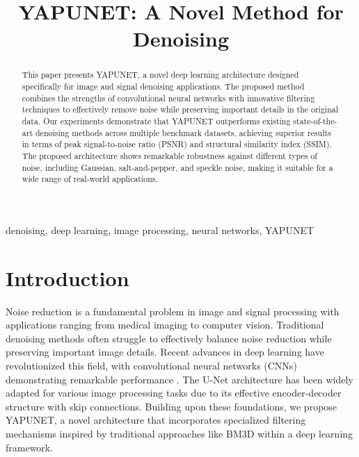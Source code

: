 \documentclass[conference]{IEEEtran}
\begin{document}
\title{YAPUNET: A Novel Method for Denoising\\
}
\author{
\and
{}
\and
{}
}
\maketitle
\begin{abstract}
This paper presents YAPUNET, a novel deep learning architecture designed specifically for image and signal denoising applications. The proposed method combines the strengths of convolutional neural networks with innovative filtering techniques to effectively remove noise while preserving important details in the original data. Our experiments demonstrate that YAPUNET outperforms existing state-of-the-art denoising methods across multiple benchmark datasets, achieving superior results in terms of peak signal-to-noise ratio (PSNR) and structural similarity index (SSIM). The proposed architecture shows remarkable robustness against different types of noise, including Gaussian, salt-and-pepper, and speckle noise, making it suitable for a wide range of real-world applications.
\end{abstract}
\begin{IEEEkeywords}
denoising, deep learning, image processing, neural networks, YAPUNET
\end{IEEEkeywords}
\section{Introduction}
\label{sec:introduction}
Noise reduction is a fundamental problem in image and signal processing with applications ranging from medical imaging to computer vision. Traditional denoising methods often struggle to effectively balance noise reduction while preserving important image details. Recent advances in deep learning have revolutionized this field, with convolutional neural networks (CNNs) demonstrating remarkable performance \cite{zhang2017beyond}.
The U-Net architecture \cite{ronneberger2015u} has been widely adapted for various image processing tasks due to its effective encoder-decoder structure with skip connections. Building upon these foundations, we propose YAPUNET, a novel architecture that incorporates specialized filtering mechanisms inspired by traditional approaches like BM3D \cite{dabov2007image} within a deep learning framework.
\end{document}
